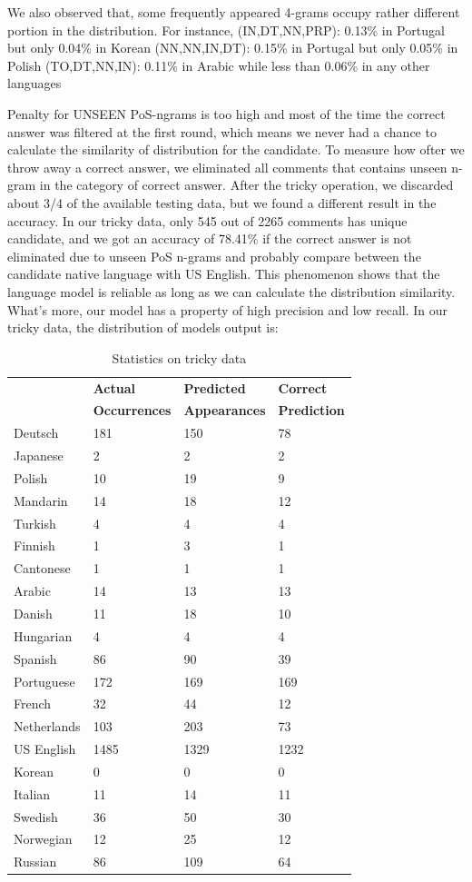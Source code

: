 \documentclass[11pt]{article}
\begin{document}
We also observed that, some frequently appeared 4-grams occupy rather different portion in the distribution. For instance,
(IN,DT,NN,PRP): 0.13\% in Portugal but only 0.04\% in Korean
(NN,NN,IN,DT): 0.15\% in Portugal but only 0.05\% in Polish
(TO,DT,NN,IN): 0.11\% in Arabic while less than 0.06\% in any other languages

Penalty for UNSEEN PoS-ngrams is too high and most of the time the correct answer was filtered at the first round, which means we never had a chance to calculate the similarity of distribution for the candidate. To measure how ofter we throw away a correct answer, we eliminated all comments that contains unseen n-gram in the category of correct answer. After the tricky operation, we discarded about 3/4 of the available testing data, but we found a different result in the accuracy. In our tricky data, only 545 out of 2265 comments has unique candidate, and we got an accuracy of 78.41\% if the correct answer is not eliminated due to unseen PoS n-grams and probably compare between the candidate native language with US English. This phenomenon shows that the language model is reliable as long as we can calculate the distribution similarity. What's more, our model has a property of high precision and low recall. In our tricky data, the distribution of models output is:  

\begin{table}[h]
\begin{center}
\small\addtolength{\tabcolsep}{-5pt}
\begin{tabular}{|l|l|l|l|}
\hline & \bf Actual & \bf Predicted & \bf Correct \\ 
& \bf Occurrences & \bf Appearances & \bf Prediction \\ \hline
Deutsch & 181 & 150 & 78 \\
Japanese & 2 & 2 & 2 \\
Polish & 10 & 19 & 9 \\
Mandarin & 14 & 18 & 12 \\
Turkish & 4 & 4 & 4 \\
Finnish & 1 & 3 & 1 \\
Cantonese & 1 & 1 & 1 \\
Arabic & 14 & 13 & 13 \\
Danish & 11 & 18 & 10 \\
Hungarian & 4 & 4 & 4 \\
Spanish & 86 & 90 & 39 \\
Portuguese & 172 & 169 & 169 \\
French & 32 & 44 & 12 \\
Netherlands & 103 & 203 & 73 \\
US English & 1485 & 1329 & 1232 \\
Korean & 0 & 0 & 0 \\
Italian & 11 & 14 & 11\\
Swedish & 36 & 50 & 30 \\
Norwegian & 12 & 25 & 12 \\
Russian & 86 & 109 & 64 \\
\hline
\end{tabular}
\end{center}
\caption{\label{font-table} Statistics on tricky data }
\end{table}
\end{document}
